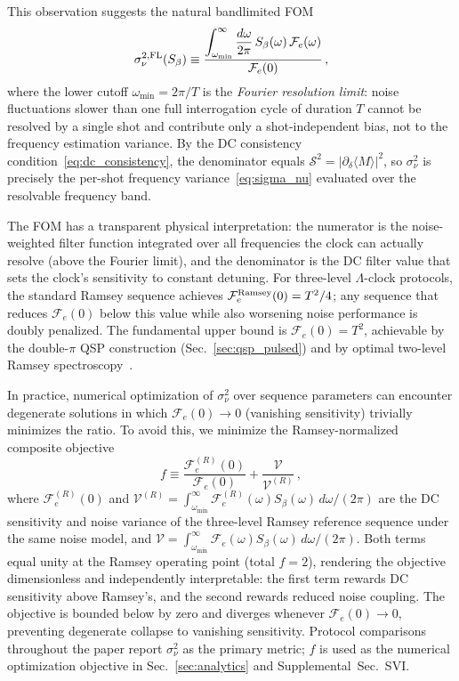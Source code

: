 \documentclass[aps,pra,twocolumn,superscriptaddress,longbibliography]{revtex4-2}
\newcommand{\be}{\begin{equation}}
\newcommand{\ee}{\end{equation}}
\begin{document}
This observation suggests the natural bandlimited FOM
\be
  \sigma^{2,\rm FL}_\nu(S_\beta) \equiv
  \frac{\displaystyle\int_{\omega_{\min}}^{\infty}
    \frac{d\omega}{2\pi}\,S_\beta(\omega)\,\mathcal{F}_e(\omega)}
  {\mathcal{F}_e(0)}\,,
  \label{eq:fom}
\ee
where the lower cutoff $\omega_{\min} = 2\pi/T$ is the \emph{Fourier resolution
limit}: noise fluctuations slower than one full interrogation cycle of duration $T$
cannot be resolved by a single shot and contribute only a shot-independent bias,
not to the frequency estimation variance.
By the DC consistency condition~\eqref{eq:dc_consistency}, the denominator equals
$\mathcal{S}^2 = |\partial_\delta\langle M\rangle|^2$, so $\sigma^2_\nu$ is
precisely the per-shot frequency variance~\eqref{eq:sigma_nu} evaluated over
the resolvable frequency band.

The FOM has a transparent physical interpretation: the numerator is the
noise-weighted filter function integrated over all frequencies the clock can
actually resolve (above the Fourier limit), and the denominator is the DC filter
value that sets the clock's sensitivity to constant detuning.
For three-level $\Lambda$-clock protocols, the standard Ramsey sequence achieves
$\mathcal{F}_e^{\rm Ramsey}(0) = T^2/4$; any sequence that reduces $\mathcal{F}_e(0)$
below this value while also worsening noise performance is doubly penalized.
The fundamental upper bound is $\mathcal{F}_e(0) = T^2$,
achievable by the double-$\pi$ QSP construction (Sec.~\ref{sec:qsp_pulsed}) and by
optimal two-level Ramsey spectroscopy~\cite{Ramsey1950}.

In practice, numerical optimization of $\sigma^2_\nu$ over sequence parameters
can encounter degenerate solutions in which $\mathcal{F}_e(0)\to 0$ (vanishing
sensitivity) trivially minimizes the ratio.
To avoid this, we minimize the Ramsey-normalized composite objective
\be
  f \equiv \frac{\mathcal{F}_e^{(R)}(0)}{\mathcal{F}_e(0)}
         + \frac{\mathcal{V}}{\mathcal{V}^{(R)}}\,,
  \label{eq:score_inv}
\ee
where $\mathcal{F}_e^{(R)}(0)$ and $\mathcal{V}^{(R)} =
\int_{\omega_{\min}}^\infty \mathcal{F}_e^{(R)}(\omega)S_\beta(\omega)\,d\omega/(2\pi)$
are the DC sensitivity and noise variance of the three-level Ramsey reference sequence
under the same noise model, and $\mathcal{V} = \int_{\omega_{\min}}^\infty
\mathcal{F}_e(\omega)S_\beta(\omega)\,d\omega/(2\pi)$.
Both terms equal unity at the Ramsey operating point (total $f = 2$), rendering the
objective dimensionless and independently interpretable: the first term rewards DC
sensitivity above Ramsey's, and the second rewards reduced noise coupling.
The objective is bounded below by zero and diverges whenever $\mathcal{F}_e(0) \to 0$,
preventing degenerate collapse to vanishing sensitivity.
Protocol comparisons throughout the paper report $\sigma^2_\nu$ as the primary
metric; $f$ is used as the numerical optimization objective in
Sec.~\ref{sec:analytics} and Supplemental~Sec.~SVI.
\end{document}
